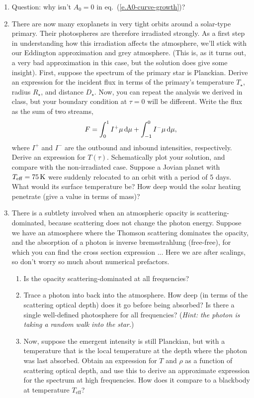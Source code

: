 \begin{enumerate}
\item Question: why isn't $A_{0}=0$ in eq.~(\ref{e.A0-curve-growth})?

\item There are now many exoplanets in very tight orbits around a solar-type primary. Their photospheres are therefore irradiated strongly. As a first step in understanding how this irradiation affects the atmosphere, we'll stick with our Eddington approximation and grey atmosphere. (This is, as it turns out, a very bad approximation in this case, but the solution does give some insight). First, suppose the spectrum of the primary star is Planckian.  Derive an expression for the incident flux in terms of the primary's temperature $T_{\star}$, radius $R_{\star}$, and distance $D_{\star}$. Now, you can repeat the analysis we derived in class, but your boundary condition at $\tau = 0$ will be different. Write the flux as the sum of two streams,
\[ F = \int_{0}^{1}I^{+}\mu\,\mathrm{d}\mu + \int_{-1}^{0}I^{-}\mu\,\mathrm{d}\mu,\]
where $I^{+}$ and $I^{-}$ are the outbound and inbound intensities, respectively.  Derive an expression for $T(\tau)$. Schematically plot your solution, and compare with the non-irradiated case. Suppose a Jovian planet with $T_{\mathrm{eff}} = 75\,\mathrm{K}$ were suddenly relocated to an orbit with a period of 5 days. What would its surface temperature be? How deep would the solar heating penetrate (give a value in terms of mass)?

\item There is a subtlety involved when an atmospheric opacity is scattering-dominated, because scattering does not change the photon energy. Suppose we have an atmosphere where the Thomson scattering dominates the opacity, and the absorption of a photon is inverse bremsstrahlung (free-free), for which you can find the cross section expression ...  Here we are after scalings, so don't worry so much about numerical prefactors.
\begin{enumerate}
\item Is the opacity scattering-dominated at all frequencies?
\item Trace a photon into back into the atmosphere.  How deep (in terms of the scattering optical depth)
does it go before being absorbed? Is there a single well-defined photosphere for all frequencies? (\emph{Hint: the photon is taking a random walk into the star.})
\item Now, suppose the emergent intensity is still Planckian, but with a temperature that is the local temperature at the depth where the photon was last absorbed. Obtain an expression for $T$ and $\rho$ as a function of scattering optical depth, and use this to derive an approximate expression for the spectrum at high frequencies.  How does it compare to a blackbody at temperature $T_{\mathrm{eff}}$?
\end{enumerate}
\end{enumerate}
